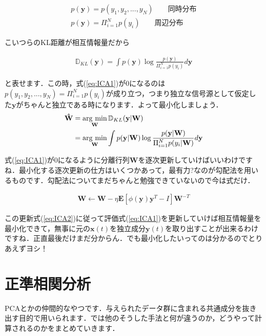 \documentclass[11pt,a4paper,dvipdfmx]{ujreport}
\newcommand{\argmin}{\mathop{\rm arg~min}\limits}
\begin{document}
\begin{eqnarray}
p (\mathbf{y}) = p(y_1, y_2,...,y_N) \qquad \text{同時分布}\\
p (\mathbf{y}) = \Pi_{i=1}^N p(y_i) \qquad \text{周辺分布}
\end{eqnarray}

こいつらのKL距離が相互情報量だから

\begin{eqnarray}
\label{eq:ICA1}
\mathbb{D}_{KL}(\mathbf{y}) = \int p(\mathbf{y}) \log \frac{p(\mathbf{y})}{\Pi_{i=1}^N p(y_i)} d\mathbf{y}
\end{eqnarray}

と表せます．この時，式(\ref{eq:ICA1})が0になるのは$p(y_1, y_2,...,y_N) =\Pi_{i=1}^N p(y_i) $が成り立つ，つまり独立な信号源として仮定した$\mathbf{y}$がちゃんと独立である時になります．よって最小化しましょう．\\

\begin{align}
\label{eq:ICA2}
\mathbf{\hat W} &= \argmin_{\mathbf{W}} \mathbb{D}_{KL}(\mathbf{y}|\mathbf{W}) \nonumber \\
&= \argmin_{\mathbf{W}} \int p(\mathbf{y}|\mathbf{W}) \log \frac{p(\mathbf{y}|\mathbf{W})}{\Pi_{i=1}^N p(y_i|\mathbf{W})} d\mathbf{y}
\end{align}

式(\ref{eq:ICA1})が0になるように分離行列$\mathbf{W}$を逐次更新していけばいいわけですね．最小化する逐次更新の仕方はいくつかあって，最有力?なのが勾配法を用いるものです．勾配法についてまだちゃんと勉強できていないので今は式だけ．

\begin{eqnarray}
\label{eq:ICA3}
\mathbf{W} \leftarrow \mathbf{W} - \eta \mathbf{E}[\phi (\mathbf{y})\mathbf{y}^T - I]\mathbf{W}^{-T}
\end{eqnarray}

この更新式(\ref{eq:ICA2})に従って評価式(\ref{eq:ICA1})を更新していけば相互情報量を最小化できて，無事に元の$\mathbf{x}(t)$を独立成分$\mathbf{y}(t)$を取り出すことが出来るわけですね．正直最後だけまだ分からん．でも最小化したいってのは分かるのでとりあえずヨシ！

\section{正準相関分析}
PCAとかの仲間的なやつです．与えられたデータ群に含まれる共通成分を抜き出す目的で用いられます．では他のそうした手法と何が違うのか，どうやって計算されるのかをまとめていきます．\\
\end{document}

